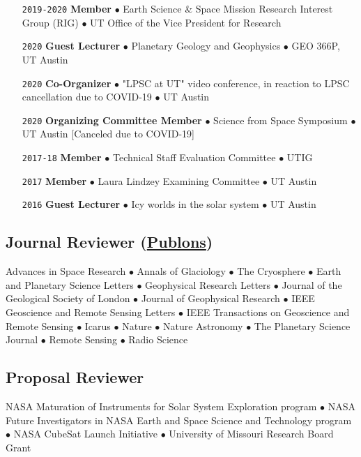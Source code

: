 \begin{itemize}[leftmargin=5.8em, labelsep=1.5em]
    \item[\texttt{2019-2020}] \textbf{Member} $\bullet$ Earth Science \& Space Mission Research Interest Group (RIG) $\bullet$ UT Office of the Vice President for Research
    \item[\texttt{2020}] \textbf{Guest Lecturer} $\bullet$ Planetary Geology and Geophysics $\bullet$  GEO 366P, UT Austin
    \item[\texttt{2020}] \textbf{Co-Organizer} $\bullet$ "LPSC at UT" video conference, in reaction to LPSC cancellation due to COVID-19 $\bullet$ UT Austin
    \item[\texttt{2020}] \textbf{Organizing Committee Member} $\bullet$ Science from Space Symposium $\bullet$ UT Austin [Canceled due to COVID-19]
    \item[\texttt{2017-18}] \textbf{Member} $\bullet$ Technical Staff Evaluation Committee $\bullet$ UTIG
    \item[\texttt{2017}] \textbf{Member} $\bullet$ Laura Lindzey Examining Committee $\bullet$ UT Austin
    \item[\texttt{2016}] \textbf{Guest Lecturer} $\bullet$ Icy worlds in the solar system $\bullet$ UT Austin
\end{itemize}

\vspace{-2em}
\subsection*{Journal Reviewer (\href{https://publons.com/author/1177202/cyril-grima\#profile}{Publons})}

Advances in Space Research $\bullet$ Annals of Glaciology $\bullet$ The Cryosphere $\bullet$ Earth and Planetary Science Letters $\bullet$ Geophysical Research Letters $\bullet$ Journal of the Geological Society of London $\bullet$ Journal of Geophysical Research $\bullet$ IEEE Geoscience and Remote Sensing Letters $\bullet$ IEEE Transactions on Geoscience and Remote Sensing $\bullet$ Icarus $\bullet$ Nature $\bullet$ Nature Astronomy $\bullet$ The Planetary Science Journal $\bullet$ Remote Sensing $\bullet$ Radio Science

\vspace{-1em}
\subsection*{Proposal Reviewer}
NASA Maturation of Instruments for Solar System Exploration program $\bullet$ NASA Future Investigators in NASA Earth and Space Science and Technology program $\bullet$ NASA CubeSat Launch Initiative $\bullet$ University of Missouri Research Board Grant

